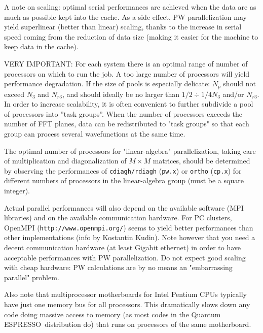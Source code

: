 \documentclass[12pt,a4paper]{article}
\def\qe{{\sc Quantum ESPRESSO}}
\def\pwx{\texttt{pw.x}}
\def\cpx{\texttt{cp.x}}
\begin{document}
A note on scaling: optimal serial performances are achieved when the data are
as much as possible kept into the cache. As a side effect, PW
parallelization may yield superlinear (better than linear) scaling,
thanks to the increase in serial speed coming from the reduction of data size 
(making it easier for the machine to keep data in the cache).

VERY IMPORTANT: For each system there is an optimal range of number of processors on which to 
run the job.  A too large number of processors will yield performance 
degradation. If the size of pools is especially delicate: $N_p$ should not 
exceed $N_3$ and $N_{r3}$, and should ideally be no larger than
$1/2\div1/4 N_3$ and/or $N_{r3}$. In order to increase scalability,
it is often convenient to 
further subdivide a pool of processors into ''task groups''.
When the number of processors exceeds the number of FFT planes, 
data can be redistributed to "task groups" so that each group 
can process several wavefunctions at the same time.

The optimal number of processors for "linear-algebra"
parallelization, taking care of multiplication and diagonalization 
of $M\times M$ matrices, should be determined by observing the
performances of \texttt{cdiagh/rdiagh} (\pwx) or \texttt{ortho} (\cpx)
for different numbers of processors in the linear-algebra group
(must be a square integer).

Actual parallel performances will also depend on the available software 
(MPI libraries) and on the available communication hardware. For
PC clusters, OpenMPI (\texttt{http://www.openmpi.org/}) seems to yield better 
performances than other implementations (info by Kostantin Kudin). 
Note however that you need a decent communication hardware (at least 
Gigabit ethernet) in order to have acceptable performances with 
PW parallelization. Do not expect good scaling with cheap hardware: 
PW calculations are by no means an "embarrassing parallel" problem.
   
Also note that multiprocessor motherboards for Intel Pentium CPUs typically 
have just one memory bus for all processors. This dramatically
slows down any code doing massive access to memory (as most codes 
in the \qe\ distribution do) that runs on processors of the same
motherboard.
\end{document}
